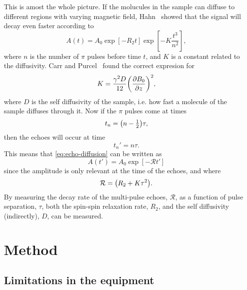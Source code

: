 \documentclass[11pt,a4paper, twocolumn,
swedish, english %
]{article}
\begin{document}
This is amost the whole picture. If the molucules in the sample can
diffuse to different regions with varying magnetic field,
Hahn~\cite{Hahn1950} showed that the signal will decay even faster
according to
\begin{equation}\label{eq:echo-diffusion}
A(t)=A_0\exp[-R_2t]
\exp[-K\frac{t^3}{n^2}],
\end{equation}
where $n$ is the number of $\pi$ pulses before time $t$, and $K$ is a
constant related to the diffusivity. Carr and
Purcel~\cite{Carr-Purcel1954} found the correct expresion for
\begin{equation}
K=\frac{\gamma^2D}{12}\qty(\pdv{B_0}{z})^2,
\end{equation}
where $D$ is the self diffusivity of the sample, i.e. how fast a
molecule of the sample diffuses through it. Now if the $\pi$ pulses
come at times
\begin{equation}
t_{n}=\qty(n-\tfrac{1}{2})\tau,
\end{equation}
then the echoes will occur at
time 
\begin{equation}
t_n'=n\tau.
\end{equation}
This means that \eqref{eq:echo-diffusion} can be written as
\begin{equation}
A(t')=A_0\exp[-\mathcal{R}t']
\end{equation}
since the amplitude is only relevant at the time of the echoes, and
where 
\begin{equation}
\mathcal{R}=\qty(R_2+K\tau^2).
\end{equation}
By measuring the decay rate of the multi-pulse echoes, $\mathcal{R}$,
as a function of pulse separation, $\tau$, both the spin-spin relaxation
rate, $R_2$, and the self diffusivity (indirectly), $D$, can be measured.





\section{Method}

\subsection{Limitations in the equipment}
\end{document}
